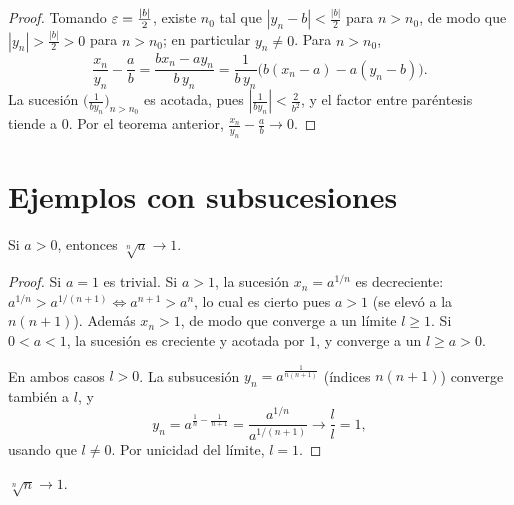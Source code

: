\begin{proof}
  Tomando \(\varepsilon = \frac{|b|}{2}\), existe \(n_0\) tal que \(|y_n - b| < \frac{|b|}{2}\) para \(n > n_0\), de modo que \(|y_n| > \frac{|b|}{2} > 0\) para \(n > n_0\); en particular \(y_n \neq 0\). Para \(n > n_0\),
  \[
    \frac{x_n}{y_n} - \frac{a}{b} = \frac{b x_n - a y_n}{b\, y_n} = \frac{1}{b\, y_n} \bigl( b (x_n - a) - a (y_n - b) \bigr).
  \]
  La sucesión \(\bigl( \frac{1}{b y_n} \bigr)_{n > n_0}\) es acotada, pues \(\left| \frac{1}{b y_n} \right| < \frac{2}{b^2}\), y el factor entre paréntesis tiende a \(0\). Por el teorema anterior, \(\frac{x_n}{y_n} - \frac{a}{b} \to 0\).
\end{proof}

\section{Ejemplos con subsucesiones}

\begin{eg}
  Si \(a > 0\), entonces \(\sqrt[n]{a} \to 1\).
\end{eg}

\begin{proof}
  Si \(a = 1\) es trivial. Si \(a > 1\), la sucesión \(x_n = a^{1/n}\) es decreciente: \(a^{1/n} > a^{1/(n+1)} \iff a^{n+1} > a^n\), lo cual es cierto pues \(a > 1\) (se elevó a la \(n(n+1)\)). Además \(x_n > 1\), de modo que converge a un límite \(l \geq 1\). Si \(0 < a < 1\), la sucesión es creciente y acotada por \(1\), y converge a un \(l \geq a > 0\).

  En ambos casos \(l > 0\). La subsucesión \(y_n = a^{\frac{1}{n(n+1)}}\) (índices \(n(n+1)\)) converge también a \(l\), y
  \[
    y_n = a^{\frac{1}{n} - \frac{1}{n+1}} = \frac{a^{1/n}}{a^{1/(n+1)}} \longrightarrow \frac{l}{l} = 1,
  \]
  usando que \(l \neq 0\). Por unicidad del límite, \(l = 1\).
\end{proof}

\begin{eg}
  \(\sqrt[n]{n} \to 1\).
\end{eg}

